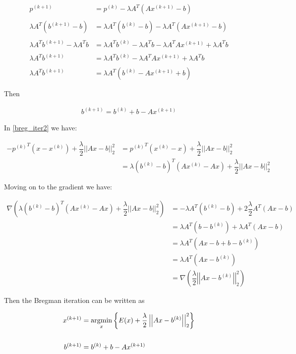\begin{align*}
p^{(k+1)} &=  p^{(k)} - \lambda A^T(Ax^{(k+1)}-b) \\
\\
\lambda A^T (b^{(k+1)}-b) &= \lambda A^T \left(b^{(k)}-b\right) -\lambda A^T (Ax^{(k+1)} - b) \\
\\
\lambda A^T b^{(k+1)} - \lambda A^T b &= \lambda A^T b^{(k)} - \lambda A^T b - \lambda A^T A x^{(k+1)} + \lambda A^T b \\
\\
\lambda A^T b^{(k+1)} &= \lambda A^T b^{(k)} - \lambda A^T A x^{(k+1)} + \lambda A^T b \\
\\
\lambda A^T b^{(k+1)} &= \lambda A^T \left(b^{(k)} - Ax^{(k+1)} + b\right)
\end{align*}

Then

\begin{align} \label{alg1-2}
b^{(k+1)} = b^{(k)} + b - Ax^{(k+1)}
\end{align}

In \eqref{breg_iter2} we have:

\begin{align*}
-{p^{(k)}}^T \left(x-x^{(k)}\right) + \dfrac{\lambda}{2} ||Ax-b||_2^2 &= {p^{(k)}}^T \left(x^{(k)}-x\right) + \dfrac{\lambda}{2} ||Ax-b||_2^2 \\
 &= \lambda \left(b^{(k)}-b\right)^T \left(Ax^{(k)}-Ax\right) +  \dfrac{\lambda}{2} ||Ax-b||_2^2
\end{align*}

Moving on to the gradient we have:

\begin{align*}
\nabla \left(\lambda \left(b^{(k)}-b\right)^T \left(Ax^{(k)}-Ax\right) +  \dfrac{\lambda}{2} ||Ax-b||_2^2 \right) &= -\lambda A^T \left(b^{(k)}-b\right) + 2 \dfrac{\lambda}{2} A^T (Ax-b) \\
 &= \lambda A^T \left(b-b^{(k)}\right) +  \lambda A^T (Ax-b) \\
 &= \lambda A^T \left(Ax-b+b-b^{(k)}\right) \\
 &= \lambda A^T \left(Ax-b^{(k)}\right) \\
 &= \nabla \left(\dfrac{\lambda}{2} \left|\left|Ax-b^{(k)}\right|\right|_2^2 \right)
\end{align*}

Then the Bregman iteration can be written as

\begin{align}
\begin{aligned}
x^{(k+1)} &= \mathop{\mathrm{argmin}}\limits_x \left\{ E(x) + \dfrac{\lambda}{2} \left|\left|Ax-b^{(k)}\right|\right|_2^2 \label{alg1-1} \right\} \\
\\
b^{(k+1)} &= b^{(k)} + b - Ax^{(k+1)}
\end{aligned}
\end{align}

